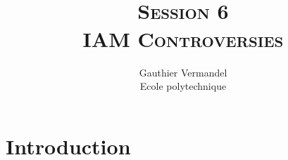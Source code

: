 \documentclass[xcolor=x11names,compress,aspectratio=169]{beamer}%
\begin{document}
%

\title[\SHORTNAME]{
\textsc{\footnotesize\SHORTNAME\\ Session 6\\[0.35em] \Large IAM Controversies}
\\
}
\author{ Gauthier Vermandel\\
{\footnotesize Ecole polytechnique}}
\date{}%
%

\begin{frame}%
%

\maketitle
%

\transboxout
\end{frame}%
%

%
\section{Introduction}%
\end{document}
